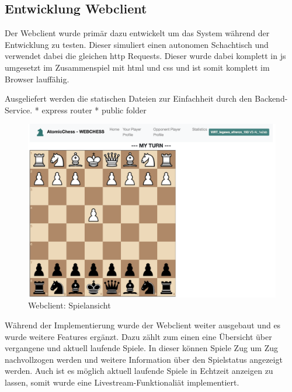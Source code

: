 \hypertarget{entwicklung-webclient}{%
\subsection{Entwicklung Webclient}\label{entwicklung-webclient}}

Der Webclient wurde primär dazu entwickelt um das System während der
Entwicklung zu testen. Dieser simuliert einen autonomen Schachtisch und
verwendet dabei die gleichen \gls{http} Requests. Dieser wurde dabei
komplett in \gls{js} umgesetzt im Zusammenspiel mit \gls{html} und
\gls{css} und ist somit komplett im Browser lauffähig.

Ausgeliefert werden die statischen Dateien zur Einfachheit durch den
Backend-Service. * express router * public folder

\begin{figure}
\centering
\includegraphics{images/ATC_webclient.png}
\caption{Webclient: Spielansicht}
\end{figure}

Während der Implementierung wurde der Webclient weiter ausgebaut und es
wurde weitere Features ergänzt. Dazu zählt zum einen eine Übersicht über
vergangene und aktuell laufende Spiele. In dieser können Spiele Zug um
Zug nachvollzogen werden und weitere Information über den Spielstatus
angezeigt werden. Auch ist es möglich aktuell laufende Spiele in
Echtzeit anzeigen zu lassen, somit wurde eine Livestream-Funktionaliät
implementiert.

